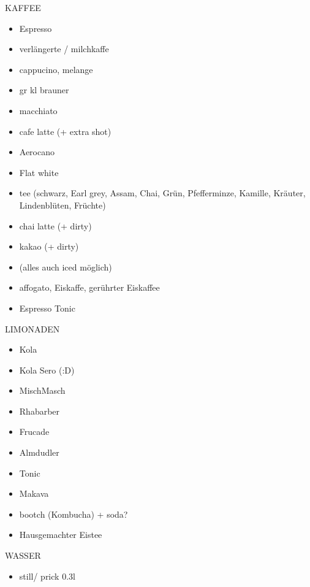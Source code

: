 \documentclass[12pt]{article}
\begin{document}

KAFFEE
\begin{itemize}[itemsep=0pt]
    \item[] Espresso
    \item[] verlängerte / milchkaffe
    \item[] cappucino, melange
    \item[] gr kl brauner
    \item[] macchiato
    \item[] cafe latte (+ extra shot)
    \item[] \textcolor{JungleGreen}{Aerocano}
    \item[] \textcolor{JungleGreen}{Flat white}
    \item[] tee (schwarz, Earl grey, Assam, Chai, Grün, Pfefferminze, Kamille, Kräuter, Lindenblüten, Früchte)
    \item[] chai latte \textcolor{JungleGreen}{(+ dirty)}
    \item[] kakao \textcolor{JungleGreen}{(+ dirty)}
    \item[] (alles auch iced möglich)
    \item[] affogato, Eiskaffe, \textcolor{JungleGreen}{gerührter Eiskaffee}
    \item[] \textcolor{JungleGreen}{Espresso Tonic}
\end{itemize}
    
    
LIMONADEN
\begin{itemize}[itemsep=0pt]
    \item[] Kola
    \item[] Kola Sero (:D)
    \item[] MischMasch
    \item[] Rhabarber
    \item[] Frucade
    \item[] Almdudler
    \item[] Tonic
    \item[] Makava
    \item[] \textcolor{JungleGreen}{bootch (Kombucha) + soda?}
    \item[] Hausgemachter Eistee
\end{itemize}

WASSER
\begin{itemize}[itemsep=0pt]
    \item[] still/ prick 0.3l
\end{itemize}
    
\end{document}
